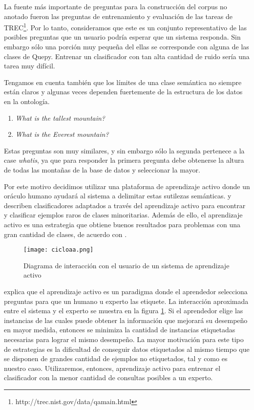 La fuente más importante de preguntas para la construcción del corpus no anotado fueron las preguntas de entrenamiento y evaluación de las tareas de TREC\footnote  {http://trec.nist.gov/data/qamain.html}. Por lo tanto, consideramos que este es un conjunto representativo de las posibles preguntas que un usuario podría esperar que un sistema responda. Sin embargo sólo una porción muy pequeña del ellas se corresponde con alguna de las clases de Quepy. Entrenar un clasificador con tan alta cantidad de ruido sería una tarea muy difícil.

Tengamos en cuenta también que los límites de una clase semántica no siempre están claros y algunas veces dependen fuertemente de la estructura de los datos en la ontología.

\begin{example}\label{preguntas-similares}\hfill
    \begin{enumerate}
    \item \textit{What is the tallest mountain?}
    \item \textit{What is the Everest mountain?}
    \end{enumerate}
\end{example}

Estas preguntas son muy similares, y sin embargo sólo la segunda pertenece a la case \textit{whatis}, ya que para responder la primera pregunta debe obtenerse la altura de todas las montañas de la base de datos y seleccionar la mayor.

Por este motivo decidimos utilizar una plataforma de aprendizaje activo donde un oráculo humano ayudará al sistema a delimitar estas sutilezas semánticas. \citet{rare-classes-holpedales} y \citet{AL-imbalanced-Ertekin} describen clasificadores adaptados a través del aprendizaje activo para encontrar y clasificar ejemplos raros de clases minoritarias. Además de ello, el aprendizaje activo es una estrategia que obtiene buenos resultados para problemas con una gran cantidad de clases, de acuerdo con \citet{al-multiclass-jain}.

\begin{figure}[h]
\caption{Diagrama de interacción con el usuario de un sistema de aprendizaje activo}\label{cicloaa}
\texttt{[image: cicloaa.png]}
\centering
\end{figure}

\citet{settles_active_learning_survey} explica que el aprendizaje activo es un paradigma donde el aprendedor selecciona preguntas para que un humano u experto las etiquete. La interacción aproximada entre el sistema y el experto se muestra en la figura \ref{cicloaa}. Si el aprendedor elige las instancias de las cuales puede obtener la información que mejorará su desempeño en mayor medida, entonces se minimiza la cantidad de instancias etiquetadas necesarias para lograr el mismo desempeño. La mayor motivación para este tipo de estrategias es la dificultad de conseguir datos etiquetados al mismo tiempo que se disponen de grandes cantidad de ejemplos no etiquetados, tal y como es nuestro caso. Utilizaremos, entonces, aprendizaje activo para entrenar el clasificador con la menor cantidad de consultas posibles a un experto.

